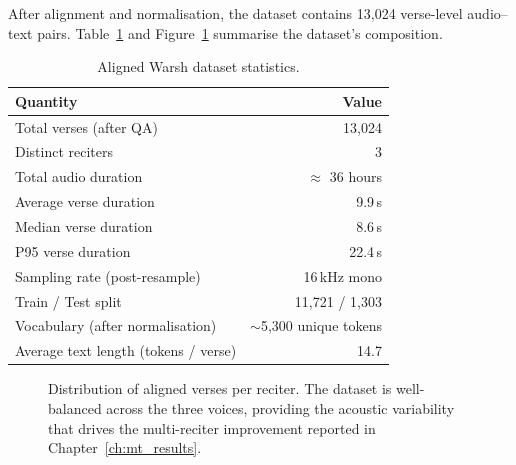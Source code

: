\documentclass[12pt,a4paper]{report}
\begin{document}
After alignment and normalisation, the dataset contains 13{,}024
verse-level audio--text pairs. Table~\ref{tab:mt_dataset_stats} and
Figure~\ref{fig:mt_dataset_dist} summarise the dataset's composition.

\begin{table}[H]
  \centering
  \caption{Aligned Warsh dataset statistics.}
  \label{tab:mt_dataset_stats}
  \renewcommand{\arraystretch}{1.3}
  \begin{tabular}{lr}
    \toprule
    \textbf{Quantity} & \textbf{Value} \\
    \midrule
    Total verses (after QA)      & 13{,}024 \\
    Distinct reciters            & 3 \\
    Total audio duration         & $\approx$ 36 hours \\
    Average verse duration       & 9.9\,s \\
    Median verse duration        & 8.6\,s \\
    P95 verse duration           & 22.4\,s \\
    Sampling rate (post-resample) & 16\,kHz mono \\
    Train / Test split            & 11{,}721 / 1{,}303 \\
    Vocabulary (after normalisation) & $\sim$5{,}300 unique tokens \\
    Average text length (tokens / verse) & 14.7 \\
    \bottomrule
  \end{tabular}
\end{table}

\begin{figure}[H]
  \centering
  \caption[Reciter distribution]{Distribution of aligned verses per
  reciter. The dataset is well-balanced across the three voices, providing
  the acoustic variability that drives the multi-reciter improvement
  reported in Chapter~\ref{ch:mt_results}.}
  \label{fig:mt_dataset_dist}
\end{figure}
\end{document}
